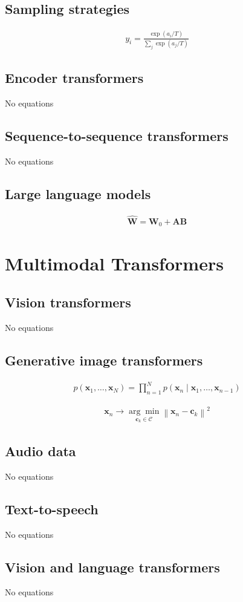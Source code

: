 \documentclass{article}
\begin{document}
\subsection{Sampling strategies}
\begin{align*}
y_{i}=\frac{\exp \left(a_{i} / T\right)}{\sum_{j} \exp \left(a_{j} / T\right)} \tag{12.35}
\end{align*}

\subsection{Encoder transformers}
No equations

\subsection{Sequence-to-sequence transformers}
No equations

\subsection{Large language models}
\begin{align*}
\widehat{\mathbf{W}}=\mathbf{W}_{0}+\mathbf{A B} \tag{12.36}
\end{align*}

\section{Multimodal Transformers}

\subsection{Vision transformers}
No equations

\subsection{Generative image transformers}
\begin{align*}
p\left(\mathbf{x}_{1}, \ldots, \mathbf{x}_{N}\right)=\prod_{n=1}^{N} p\left(\mathbf{x}_{n} \mid \mathbf{x}_{1}, \ldots, \mathbf{x}_{n-1}\right) \tag{12.37}
\end{align*}

\begin{align*}
\mathbf{x}_{n} \rightarrow \underset{\mathbf{c}_{k} \in \mathcal{C}}{\arg \min }\left\|\mathbf{x}_{n}-\mathbf{c}_{k}\right\|^{2} \tag{12.38}
\end{align*}

\subsection{Audio data}
No equations

\subsection{Text-to-speech}
No equations

\subsection{Vision and language transformers}
No equations
\end{document}

